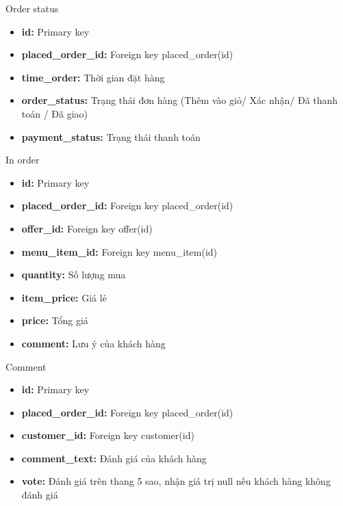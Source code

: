 \documentclass[aspectratio=43,xcolor=dvipsnames]{beamer}
\begin{document}
	\begin{frame}{Order status}
		\begin{itemize}
			\item \textbf{id:} Primary key
			\item \textbf{placed\_order\_id:} Foreign key placed\_order(id)
			\item \textbf{time\_order:} Thời gian đặt hàng
			\item \textbf{order\_status:} Trạng thái đơn hàng (Thêm vào giỏ/ Xác nhận/ Đã thanh toán / Đã giao)
			\item \textbf{payment\_status:} Trạng thái thanh toán
		\end{itemize}
	\end{frame}
	
	\begin{frame}{In order}
		\begin{itemize}
			\item \textbf{id:} Primary key
			\item \textbf{placed\_order\_id:} Foreign key placed\_order(id)
			\item \textbf{offer\_id:} Foreign key offer(id)
			\item \textbf{menu\_item\_id:} Foreign key menu\_item(id)
			\item \textbf{quantity:} Số lượng mua
			\item \textbf{item\_price:} Giá lẻ
			\item \textbf{price:} Tổng giá
			\item \textbf{comment:} Lưu ý của khách hàng
		\end{itemize}
	\end{frame}
	
	\begin{frame}{Comment}
		\begin{itemize}
			\item \textbf{id:} Primary key
			\item \textbf{placed\_order\_id:} Foreign key placed\_order(id)
			\item \textbf{customer\_id:} Foreign key customer(id)
			\item \textbf{comment\_text:} Đánh giá của khách hàng
			\item \textbf{vote:} Đánh giá trên thang 5 sao, nhận giá trị null nếu khách hàng không đánh giá
		\end{itemize}
	\end{frame}
\end{document}
